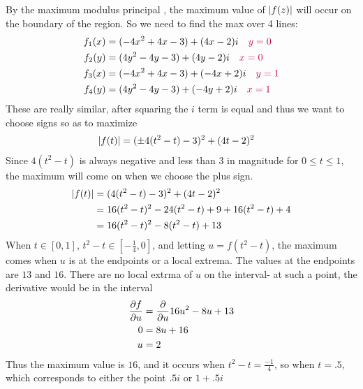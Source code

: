 \documentclass{homework}
\begin{document}
\begin{solution}
                              By the maximum modulus principal %
                              , the maximum value of $\left|f(z)\right|$ will occur on the boundary of the region. So we need to find the max over 4 lines:
                              \begin{align*}
                              f_1(x) &= (-4 x^2 + 4 x - 3) + (4 x - 2)i\quad \color{purple} y=0\\ 
                              f_2(y) &=  (4 y^2 - 4y - 3) + (4y - 2)i \quad \color{purple} x=0\\
                              f_3(x) &=  (-4 x^2 + 4 x - 3) + (-4 x + 2)i \quad \color{purple} y=1 \\
                              f_4(y) &=  (4 y^2 - 4y - 3) + (-4y + 2)i \quad \color{purple} x=1
                              \end{align*}
                              These are really similar, after squaring the $i$ term is equal and thus we want to choose signs so as to maximize
                              \begin{align*}
                              \left|f(t)\right| &= (\pm 4(t^2 - t) -3)^2 + (4t - 2)^2
                              \end{align*}
                              Since $4(t^2 - t)$ is always negative and less than 3 in magnitude for $0\leq t \leq 1$, the maximum will come on when we choose the plus sign.
                              \begin{align*}
                              \left|f(t)\right| &= (4(t^2 - t) -3)^2 + (4t - 2)^2\\
                              &= 16(t^2 - t)^2 - 24(t^2 - t)  + 9+ 16(t^2 - t) + 4\\
                              &= 16(t^2 - t)^2 - 8(t^2 - t) + 13
                              \end{align*}
                              When $t\in [0, 1]$, $t^2 - t\in [-\frac{1}{4}, 0]$, and letting $u = f(t^2-t)$, the maximum comes when $u$ is at the endpoints or a local extrema. The values at the endpoints are $13$ and $16$. There are no local extrma of $u$ on the interval- at such a point, the derivative would be in the interval
                              \begin{align*}
                              \frac{\partial f}{\partial u} &= \frac{\partial }{\partial u}16u^2 - 8u + 13\\
                              0 &= 8u + 16\\
                              u &= 2
                              \end{align*}
                              Thus the maximum value is $16$, and it occurs when $t^2-t=\frac{-1}{4}$, so when $t = .5$, which corresponds to either the point $.5i$ or $1+.5i$
                              \end{solution}
\end{document}
